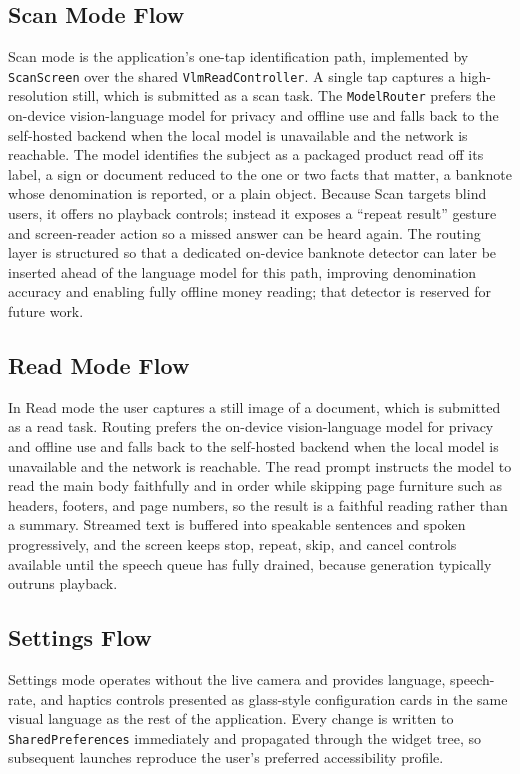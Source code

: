 \documentclass[a4paper]{report}
\begin{document}
\subsection{Scan Mode Flow}
Scan mode is the application's one-tap identification path, implemented by \texttt{ScanScreen} over the shared \texttt{VlmReadController}. A single tap captures a high-resolution still, which is submitted as a scan task. The \texttt{ModelRouter} prefers the on-device vision-language model for privacy and offline use and falls back to the self-hosted backend when the local model is unavailable and the network is reachable. The model identifies the subject as a packaged product read off its label, a sign or document reduced to the one or two facts that matter, a banknote whose denomination is reported, or a plain object. Because Scan targets blind users, it offers no playback controls; instead it exposes a ``repeat result'' gesture and screen-reader action so a missed answer can be heard again. The routing layer is structured so that a dedicated on-device banknote detector can later be inserted ahead of the language model for this path, improving denomination accuracy and enabling fully offline money reading; that detector is reserved for future work.

\subsection{Read Mode Flow}
In Read mode the user captures a still image of a document, which is submitted as a read task. Routing prefers the on-device vision-language model for privacy and offline use and falls back to the self-hosted backend when the local model is unavailable and the network is reachable. The read prompt instructs the model to read the main body faithfully and in order while skipping page furniture such as headers, footers, and page numbers, so the result is a faithful reading rather than a summary. Streamed text is buffered into speakable sentences and spoken progressively, and the screen keeps stop, repeat, skip, and cancel controls available until the speech queue has fully drained, because generation typically outruns playback.

\subsection{Settings Flow}
Settings mode operates without the live camera and provides language, speech-rate, and haptics controls presented as glass-style configuration cards in the same visual language as the rest of the application. Every change is written to \texttt{SharedPreferences} immediately and propagated through the widget tree, so subsequent launches reproduce the user's preferred accessibility profile.
\end{document}

